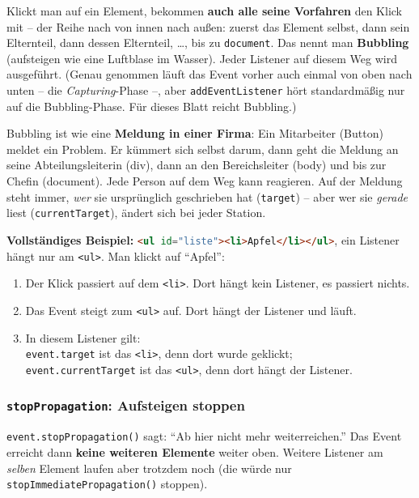 \documentclass[a4paper,11pt]{article}
\begin{document}
Klickt man auf ein Element, bekommen \textbf{auch alle seine Vorfahren} den Klick mit -- der Reihe nach von innen
nach außen: zuerst das Element selbst, dann sein Elternteil, dann dessen Elternteil, \dots, bis zu \texttt{document}.
Das nennt man \textbf{Bubbling} (aufsteigen wie eine Luftblase im Wasser). Jeder Listener auf diesem Weg wird ausgeführt.
(Genau genommen läuft das Event vorher auch einmal von oben nach unten -- die \emph{Capturing}-Phase --, aber
\texttt{addEventListener} hört standardmäßig nur auf die Bubbling-Phase. Für dieses Blatt reicht Bubbling.)

\begin{analogie}
Bubbling ist wie eine \textbf{Meldung in einer Firma}: Ein Mitarbeiter (Button) meldet ein Problem. Er kümmert
sich selbst darum, dann geht die Meldung an seine Abteilungsleiterin (div), dann an den Bereichsleiter (body) und
bis zur Chefin (document). Jede Person auf dem Weg kann reagieren. Auf der Meldung steht immer, \emph{wer} sie
ursprünglich geschrieben hat (\texttt{target}) -- aber wer sie \emph{gerade} liest (\texttt{currentTarget}), ändert
sich bei jeder Station.
\end{analogie}

\textbf{Vollständiges Beispiel:} \lstinline[language=HTML]|<ul id="liste"><li>Apfel</li></ul>|, ein Listener hängt
nur am \texttt{<ul>}. Man klickt auf "`Apfel"':
\begin{enumerate}[nosep]
\item Der Klick passiert auf dem \texttt{<li>}. Dort hängt kein Listener, es passiert nichts.
\item Das Event steigt zum \texttt{<ul>} auf. Dort hängt der Listener und läuft.
\item In diesem Listener gilt:\\
      \texttt{event.target} ist das \texttt{<li>}, denn dort wurde geklickt;\\
      \texttt{event.currentTarget} ist das \texttt{<ul>}, denn dort hängt der Listener.
\end{enumerate}

\subsubsection*{\texttt{stopPropagation}: Aufsteigen stoppen}

\lstinline|event.stopPropagation()| sagt: "`Ab hier nicht mehr weiterreichen."' Das Event erreicht dann
\textbf{keine weiteren Elemente} weiter oben. Weitere Listener am \emph{selben} Element laufen aber trotzdem noch
(die würde nur \lstinline|stopImmediatePropagation()| stoppen).
\end{document}
